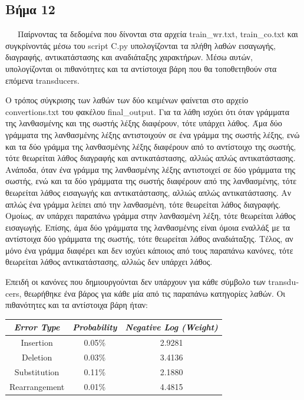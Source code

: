 \documentclass{article}
\begin{document}
\subsection*{Βήμα 12}
\ \ \ Παίρνοντας τα δεδομένα που δίνονται στα αρχεία \textlatin{train\_wr.txt, train\_co.txt} και συγκρίνοντάς μέσω του \textlatin{script C.py} υπολογίζονται τα πλήθη λαθών εισαγωγής,  διαγραφής, αντικατάστασης και αναδιάταξης χαρακτήρων. Μέσω αυτών, υπολογίζονται οι πιθανότητες και τα αντίστοιχα βάρη που θα τοποθετηθούν στα επόμενα \textlatin{transducers}. \par
Ο τρόπος σύγκρισης των λαθών των δύο κειμένων φαίνεται στο αρχείο \textlatin{convertions.txt} του φακέλου \textlatin{final\_output}. Για τα λάθη ισχύει ότι όταν γράμματα της λανθασμένης και της σωστής λέξης διαφέρουν, τότε υπάρχει λάθος. Άμα δύο γράμματα της λανθασμένης λέξης  αντιστοιχούν σε ένα γράμμα της σωστής λέξης, ενώ και τα δύο γράμμα της λανθασμένης λέξης διαφέρουν από το αντίστοιχο της σωστής, τότε θεωρείται λάθος διαγραφής και αντικατάστασης, αλλιώς απλώς αντικατάστασης. Ανάποδα, όταν ένα γράμμα της λανθασμένης λέξης αντιστοιχεί σε δύο γράμματα της σωστής, ενώ και τα δύο γράμματα της σωστής διαφέρουν από της λανθασμένης, τότε θεωρείται λάθος εισαγωγής και αντικατάστασης, αλλιώς απλώς αντικατάστασης. Αν απλώς ένα γράμμα λείπει από την λανθασμένη, τότε θεωρείται λάθος διαγραφής. Ομοίως, αν υπάρχει παραπάνω γράμμα στην λανθασμένη λέξη, τότε θεωρείται λάθος εισαγωγής. Επίσης, άμα δύο γράμματα της λανθασμένης είναι όμοια εναλλάξ με τα αντίστοιχα δύο γράμματα της σωστής, τότε θεωρείται λάθος αναδιάταξης. Τέλος, αν μόνο ένα γράμμα διαφέρει και δεν ισχύει κάποιος από τους παραπάνω κανόνες, τότε θεωρείται λάθος αντικατάστασης, αλλιώς δεν υπάρχει λάθος. \par
Επειδή οι κανόνες που δημιουργούνται δεν υπάρχουν για κάθε σύμβολο των \textlatin{transducers}, θεωρήθηκε ένα βάρος για κάθε μία από τις παραπάνω κατηγορίες λαθών. Οι πιθανότητες και τα αντίστοιχα βάρη ήταν: \\
\begin{center}
	\begin{tabular}{|| c | c | c ||}
	\hline
	\textit{\textlatin{Error Type}} & \textit{\textlatin{Probability}} & \textit{\textlatin{Negative Log (Weight)}} \\ [0.5ex]
	\hline\hline
	\textlatin{Insertion} & 0.05\% & 2.9281 \\
	\hline
	\textlatin{Deletion} & 0.03\% & 3.4136 \\
	\hline
	\textlatin{Substitution} & 0.11\% & 2.1880 \\
	\hline
	\textlatin{Rearrangement} & 0.01\% & 4.4815 \\ [1ex]
	\hline
	\end{tabular}
\end{center}\par
\end{document}
